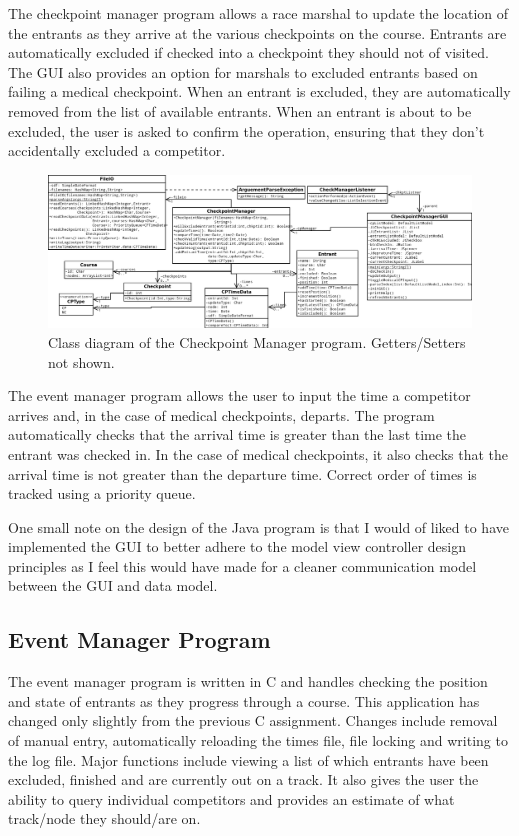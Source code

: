 \documentclass{article}
\begin{document}
The checkpoint manager program allows a race marshal to update the location of the entrants as they arrive at the various checkpoints on the course. Entrants are automatically excluded if checked into a checkpoint they should not of visited. The GUI also provides an option for marshals to excluded entrants based on failing a medical checkpoint. When an entrant is excluded, they are automatically removed from the list of available entrants. When an entrant is about to be excluded, the user is asked to confirm the operation, ensuring that they don't accidentally excluded a competitor.

\begin{figure}[H]
\centering
\includegraphics[width=1.1\textwidth]{diagrams/checkpoint_manager.png}
\caption{Class diagram of the Checkpoint Manager program. Getters/Setters not shown.}
\label{fig:GUI-image}
\end{figure}

The event manager program allows the user to input the time a competitor arrives and, in the case of medical checkpoints, departs. The program automatically checks that the arrival time is greater than the last time the entrant was checked in. In the case of medical checkpoints, it also checks that the arrival time is not greater than the departure time. Correct order of times is tracked using a priority queue.

One small note on the design of the Java program is that I would of liked to have implemented the GUI to better adhere to the model view controller design principles as I feel this would have made for a cleaner communication model between the GUI and data model.

\subsection{Event Manager Program}
The event manager program is written in C and handles checking the position and state of entrants as they progress through a course. This application has changed only slightly from the previous C assignment. Changes include removal of manual entry, automatically reloading the times file, file locking and writing to the log file. Major functions include viewing a list of which entrants have been excluded, finished and are currently out on a track. It also gives the user the ability to query individual competitors and provides an estimate of what track/node they should/are on.
\end{document}
